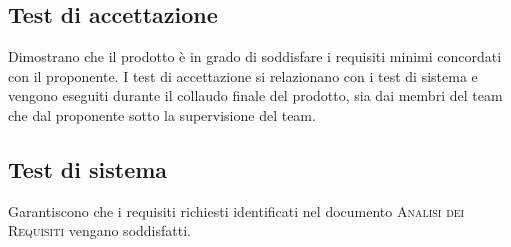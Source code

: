 \documentclass[../piano-di-qualifica.tex]{subfiles}
\begin{document}
\subsection{Test di accettazione}
\label{sub:test_di_accettazione}
Dimostrano che il prodotto è in grado di soddisfare i requisiti minimi concordati con il proponente.
I test di accettazione si relazionano con i test di sistema e vengono eseguiti durante il collaudo finale del prodotto, sia dai membri del team che dal proponente sotto la supervisione del team.

\subsection{Test di sistema}
\label{sub:test_di_sistema}
Garantiscono che i requisiti richiesti identificati nel documento \textsc{Analisi dei Requisiti} vengano soddisfatti.
\end{document}
